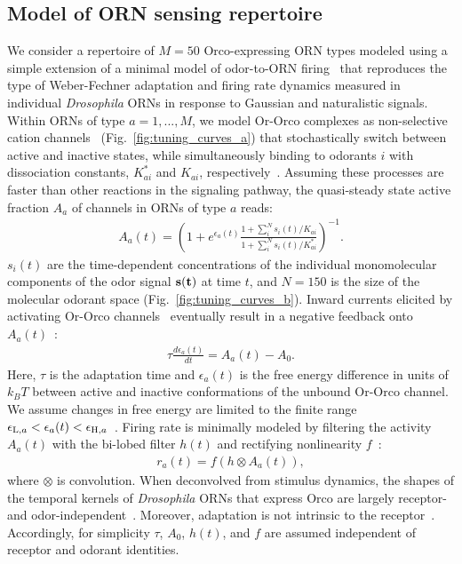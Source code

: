 \documentclass[9pt,twocolumn,twoside]{pnas-new}
\begin{document}
\subsection*{Model of ORN sensing repertoire}

We consider a repertoire of $M=50$ Orco-expressing ORN types modeled using a simple extension of a minimal model of odor-to-ORN firing~\cite{srinivas_elife} that reproduces the type of Weber-Fechner adaptation and firing rate dynamics measured in individual \textit{Drosophila} ORNs in response to Gaussian and naturalistic signals. Within ORNs of type $a=1,...,M$, we model Or-Orco complexes as non-selective cation channels~\cite{orco_structure} (Fig.~\ref{fig:tuning_curves_a}) that stochastically switch between active and inactive states, while simultaneously binding to odorants $i$ with dissociation constants, $K^*_{ai}$ and $K_{ai}$, respectively~\cite{nagel_wilson_biophysical,srinivas_elife}. Assuming these processes are faster than other reactions in the signaling pathway, the quasi-steady state active fraction $A_a$ of channels in ORNs of type $a$ reads:
\begin{align}
A_a(t) = \left(1 + e^{\epsilon_a(t)}\frac{1 + \sum_i^N s_i(t)/K_{ai}}{1 + \sum_i^N s_i(t)/K^*_{ai}}\right)^{-1}.
\label{eq:steady_state_act_OR}
\end{align}
$s_i(t)$ are the time-dependent concentrations of the individual monomolecular components of the odor signal $\bf{s}(t)$ at time $t$, and $N=150$ is the size of the molecular odorant space (Fig.~\ref{fig:tuning_curves_b}). Inward currents elicited by activating Or-Orco channels~\cite{orco_structure} eventually result in a negative feedback onto $A_a(t)$~\cite{nagel_wilson_biophysical,srinivas_elife,cao_WL}:
\begin{align}
\tau\frac{d\epsilon_a(t)}{dt} = {A}_{a}(t) - A_0.
\label{eq:adaptation_dynamics}
\end{align}
Here, $\tau$ is the adaptation time and $\epsilon_a(t)$ is the free energy difference in units of $k_B T$ between active and inactive conformations of the unbound Or-Orco channel. We assume changes in free energy are limited to the finite range $\epsilon_{\textup{L}, a} < \epsilon_a(t) < \epsilon_{\textup{H}, a}$~\cite{srinivas_elife}. Firing rate is minimally modeled by filtering the activity $A_a(t)$ with the bi-lobed filter $h(t)$ and rectifying nonlinearity $f$~\cite{srinivas_elife}:
\begin{align}
r_a(t)=f\left(h\otimes A_a(t)\right),
\label{eq:firing_machinery}
\end{align}
where $\otimes$ is convolution. When deconvolved from stimulus dynamics, the shapes of the temporal kernels of \textit{Drosophila} ORNs that express Orco are largely receptor- and odor-independent~\cite{martelli,srinivas_elife,si2017invariances}. Moreover, adaptation is not intrinsic to the receptor~\cite{nagel_wilson_biophysical}. Accordingly, for simplicity $\tau$, $A_0$, $h(t)$, and $f$ are assumed independent of receptor and odorant identities. 
\end{document}
